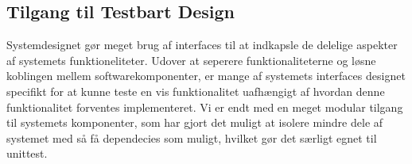 \subsection{Tilgang til Testbart Design}

Systemdesignet gør meget brug af interfaces til at indkapsle de delelige aspekter af systemets funktioneliteter. 
Udover at seperere funktionaliteterne og løsne koblingen mellem softwarekomponenter, er mange af systemets interfaces designet specifikt for at kunne teste en vis funktionalitet uafhængigt af hvordan denne funktionalitet forventes implementeret.
Vi er endt med en meget modular tilgang til systemets komponenter, som har gjort det muligt at isolere mindre dele af systemet med så få dependecies som muligt, hvilket gør det særligt egnet til unittest.
